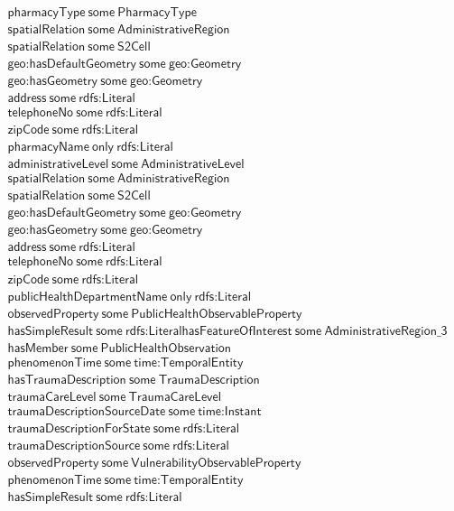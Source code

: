 \begin{align}
  \textsf{pharmacyType}~\textsf{some}~\textsf{PharmacyType}\\
  \textsf{spatialRelation}~\textsf{some}~\textsf{AdministrativeRegion}\\
  \textsf{spatialRelation}~\textsf{some}~\textsf{S2Cell}\\
  \textsf{geo:hasDefaultGeometry}~\textsf{some}~\textsf{geo:Geometry}\\
  \textsf{geo:hasGeometry}~\textsf{some}~\textsf{geo:Geometry}\\
  \textsf{address}~\textsf{some}~\textsf{rdfs:Literal}\\
  \textsf{telephoneNo}~\textsf{some}~\textsf{rdfs:Literal}\\
  \textsf{zipCode}~\textsf{some}~\textsf{rdfs:Literal}\\
  \textsf{pharmacyName}~\textsf{only}~\textsf{rdfs:Literal}\\
  \textsf{administrativeLevel}~\textsf{some}~\textsf{AdministrativeLevel}\\
  \textsf{spatialRelation}~\textsf{some}~\textsf{AdministrativeRegion}\\
  \textsf{spatialRelation}~\textsf{some}~\textsf{S2Cell}\\
  \textsf{geo:hasDefaultGeometry}~\textsf{some}~\textsf{geo:Geometry}\\
  \textsf{geo:hasGeometry}~\textsf{some}~\textsf{geo:Geometry}\\
  \textsf{address}~\textsf{some}~\textsf{rdfs:Literal}\\
  \textsf{telephoneNo}~\textsf{some}~\textsf{rdfs:Literal}\\
  \textsf{zipCode}~\textsf{some}~\textsf{rdfs:Literal}\\
  \textsf{publicHealthDepartmentName}~\textsf{only}~\textsf{rdfs:Literal}\\
  \textsf{observedProperty}~\textsf{some}~\textsf{PublicHealthObservableProperty}\\
  \textsf{hasSimpleResult}~\textsf{some}~\textsf{rdfs:Literal}  \textsf{hasFeatureOfInterest}~\textsf{some}~\textsf{AdministrativeRegion\_3}\\
  \textsf{hasMember}~\textsf{some}~\textsf{PublicHealthObservation}\\
  \textsf{phenomenonTime}~\textsf{some}~\textsf{time:TemporalEntity}\\
  \textsf{hasTraumaDescription}~\textsf{some}~\textsf{TraumaDescription}\\
  \textsf{traumaCareLevel}~\textsf{some}~\textsf{TraumaCareLevel}\\
  \textsf{traumaDescriptionSourceDate}~\textsf{some}~\textsf{time:Instant}\\
  \textsf{traumaDescriptionForState}~\textsf{some}~\textsf{rdfs:Literal}\\
  \textsf{traumaDescriptionSource}~\textsf{some}~\textsf{rdfs:Literal}\\
  \textsf{observedProperty}~\textsf{some}~\textsf{VulnerabilityObservableProperty}\\
  \textsf{phenomenonTime}~\textsf{some}~\textsf{time:TemporalEntity}\\
  \textsf{hasSimpleResult}~\textsf{some}~\textsf{rdfs:Literal}\end{align}


